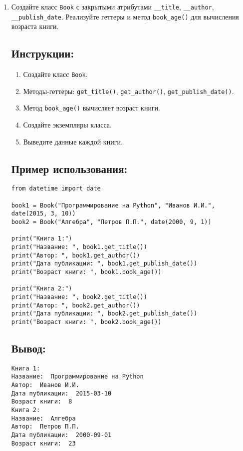 \begin{enumerate}
\item
Создайте класс \texttt{Book} с закрытыми атрибутами \texttt{\_\_title}, \texttt{\_\_author}, \texttt{\_\_publish\_date}. Реализуйте геттеры и метод \texttt{book\_age()} для вычисления возраста книги.

\subsection*{Инструкции:}
\begin{enumerate}
    \item Создайте класс \texttt{Book}.
    \item Методы-геттеры: \texttt{get\_title()}, \texttt{get\_author()}, \texttt{get\_publish\_date()}.
    \item Метод \texttt{book\_age()} вычисляет возраст книги.
    \item Создайте экземпляры класса.
    \item Выведите данные каждой книги.
\end{enumerate}

\subsection*{Пример использования:}
\begin{lstlisting}[caption=Пример кода]
from datetime import date

book1 = Book("Программирование на Python", "Иванов И.И.", date(2015, 3, 10))
book2 = Book("Алгебра", "Петров П.П.", date(2000, 9, 1))

print("Книга 1:")
print("Название: ", book1.get_title())
print("Автор: ", book1.get_author())
print("Дата публикации: ", book1.get_publish_date())
print("Возраст книги: ", book1.book_age())

print("Книга 2:")
print("Название: ", book2.get_title())
print("Автор: ", book2.get_author())
print("Дата публикации: ", book2.get_publish_date())
print("Возраст книги: ", book2.book_age())
\end{lstlisting}

\subsection*{Вывод:}
\begin{lstlisting}[caption=Ожидаемый вывод]
Книга 1:
Название:  Программирование на Python
Автор:  Иванов И.И.
Дата публикации:  2015-03-10
Возраст книги:  8
Книга 2:
Название:  Алгебра
Автор:  Петров П.П.
Дата публикации:  2000-09-01
Возраст книги:  23
\end{lstlisting}


\end{enumerate}

